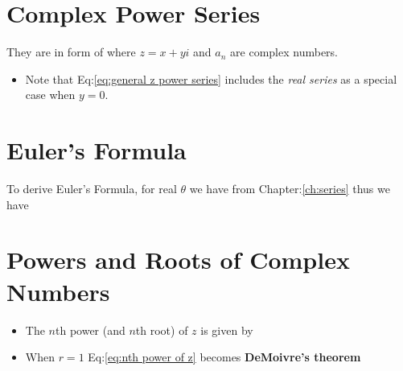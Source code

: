         \section{Complex Power Series}
            They are in form of  where $z=x+yi$ 
            and $a_n$ are complex numbers.
            \begin{itemize}
                \item Note that Eq:\eqref{eq:general z power series} includes the \textit{real series} 
                as a special case when $y=0$.
            \end{itemize}

        \section{Euler's Formula}
            To derive Euler's Formula, for real $\theta$ we have from Chapter:\ref{ch:series}
            thus we have 

        \section{Powers and Roots of Complex Numbers}
            \begin{itemize}
                \item The $n$th power (and $n$th root) of $z$ is given by 
                \item When $r=1$ Eq:\eqref{eq:nth power of z} becomes \textbf{DeMoivre’s theorem}
            \end{itemize}

